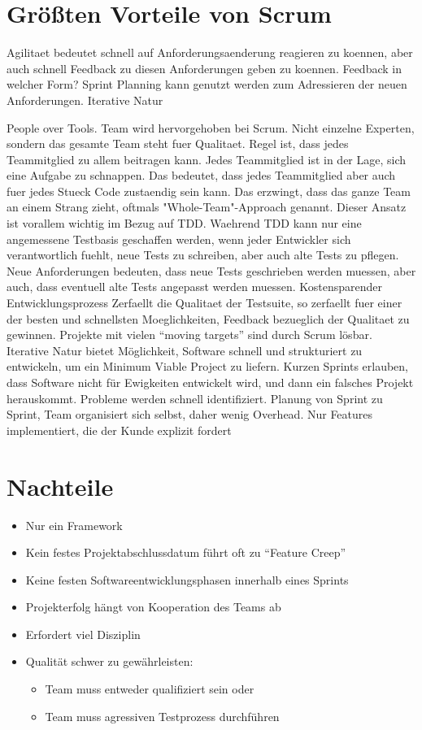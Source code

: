 \documentclass[12pt,DIV14,BCOR10mm,a4paper,twoside,parskip=half-,headsepline,headinclude,english,ngerman,bibliography=totocnumbered]{scrreprt}
\begin{document}
\section{Größten Vorteile von Scrum}

Agilitaet bedeutet schnell auf Anforderungsaenderung reagieren zu koennen, aber auch schnell Feedback zu diesen Anforderungen geben zu koennen.
Feedback in welcher Form?
Sprint Planning kann genutzt werden zum Adressieren der neuen Anforderungen.
Iterative Natur

People over Tools.
Team wird hervorgehoben bei Scrum.
Nicht einzelne Experten, sondern das gesamte Team steht fuer Qualitaet.
Regel ist, dass jedes Teammitglied zu allem beitragen kann.
Jedes Teammitglied ist in der Lage, sich eine Aufgabe zu schnappen.
Das bedeutet, dass jedes Teammitglied aber auch fuer jedes Stueck Code zustaendig sein kann.
Das erzwingt, dass das ganze Team an einem Strang zieht, oftmals "Whole-Team"-Approach genannt.
Dieser Ansatz ist vorallem wichtig im Bezug auf TDD.
Waehrend TDD kann nur eine angemessene Testbasis geschaffen werden, wenn jeder Entwickler sich verantwortlich fuehlt, neue Tests zu schreiben, aber auch alte Tests zu pflegen.
Neue Anforderungen bedeuten, dass neue Tests geschrieben werden muessen, aber auch, dass eventuell alte Tests angepasst werden muessen.
Kostensparender Entwicklungsprozess
Zerfaellt die Qualitaet der Testsuite, so zerfaellt fuer einer der besten und schnellsten Moeglichkeiten, Feedback bezueglich der Qualitaet zu gewinnen.
  Projekte mit vielen \enquote{moving targets} sind durch Scrum lösbar.
  Iterative Natur bietet Möglichkeit, Software schnell und strukturiert zu entwickeln, um ein Minimum Viable Project zu liefern.
  Kurzen Sprints erlauben, dass Software nicht für Ewigkeiten entwickelt wird, und dann ein falsches Projekt herauskommt.
  Probleme werden schnell identifiziert.
  Planung von Sprint zu Sprint, Team organisiert sich selbst, daher wenig Overhead.
  Nur Features implementiert, die der Kunde explizit fordert

\section{Nachteile}

\begin{itemize}
  \item Nur ein Framework
  \item Kein festes Projektabschlussdatum führt oft zu \enquote{Feature Creep}
  \item Keine festen Softwareentwicklungsphasen innerhalb eines Sprints
  \item Projekterfolg hängt von Kooperation des Teams ab
  \item Erfordert viel Disziplin
  \item Qualität schwer zu gewährleisten:
  \begin{itemize}
    \item Team muss entweder qualifiziert sein oder
    \item Team muss agressiven Testprozess durchführen
  \end{itemize}
\end{itemize}
\end{document}
